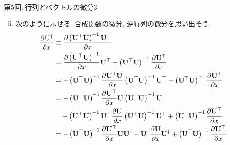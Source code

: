 \documentclass[dvipdfmx,notheorems,t]{beamer}
\begin{document}
\begin{frame}{第5回: 行列とベクトルの微分3}
\begin{enumerate}
  \setcounter{enumi}{4}
  \item 次のように示せる.
  合成関数の微分, 逆行列の微分を思い出そう.
  \begin{align*}
    \pdv{\vb{U}^\dagger}{x} &\equiv
      \pdv{\left( \vb{U}^\top \vb{U} \right)^{-1} \vb{U}^\top}{x} \\
    &= \pdv{\left( \vb{U}^\top \vb{U} \right)^{-1}}{x} \vb{U}^\top
      + \left( \vb{U}^\top \vb{U} \right)^{-1} \pdv{\vb{U}^\top}{x} \\
    &= -\left( \vb{U}^\top \vb{U} \right)^{-1}
      \pdv{\vb{U}^\top \vb{U}}{x} \left( \vb{U}^\top \vb{U} \right)^{-1} \vb{U}^\top
      + \left( \vb{U}^\top \vb{U} \right)^{-1} \pdv{\vb{U}^\top}{x} \\
    &= -\left( \vb{U}^\top \vb{U} \right)^{-1}
      \pdv{\vb{U}^\top}{x} \vb{U} \left( \vb{U}^\top \vb{U} \right)^{-1} \vb{U}^\top \\
    & \quad - \left( \vb{U}^\top \vb{U} \right)^{-1} \vb{U}^\top
      \pdv{\vb{U}}{x} \left( \vb{U}^\top \vb{U} \right)^{-1} \vb{U}^\top
      + \left( \vb{U}^\top \vb{U} \right)^{-1} \pdv{\vb{U}^\top}{x} \\
    &= -\left( \vb{U}^\top \vb{U} \right)^{-1} \pdv{\vb{U}^\top}{x} \vb{U} \vb{U}^\dagger
      - \vb{U}^\dagger \pdv{\vb{U}}{x} \vb{U}^\dagger
      + \left( \vb{U}^\top \vb{U} \right)^{-1} \pdv{\vb{U}^\top}{x}
  \end{align*}
\end{enumerate}
\end{frame}
\end{document}
